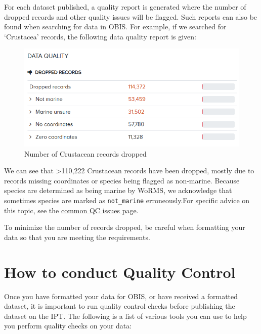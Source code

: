 \documentclass[
  letterpaper,
  DIV=11,
  numbers=noendperiod,
  oneside]{scrreprt}
\begin{document}
For each dataset published, a quality report is generated where the
number of dropped records and other quality issues will be flagged. Such
reports can also be found when searching for data in OBIS. For example,
if we searched for `Crustacea' records, the following data quality
report is given:

\begin{figure}

{\centering \includegraphics{images/crustacean-droppedrecords.png}

}

\caption{Number of Crustacean records dropped}

\end{figure}

We can see that \textgreater110,222 Crustacean records have been
dropped, mostly due to records missing coordinates or species being
flagged as non-marine. Because species are determined as being marine by
WoRMS, we acknowledge that sometimes species are marked as
\texttt{not\_marine} erroneously.For specific advice on this topic, see
the \protect\hyperlink{non-marine-species}{common QC issues page}.

To minimize the number of records dropped, be careful when formatting
your data so that you are meeting the requirements.

\hypertarget{how-to-conduct-quality-control}{%
\section{How to conduct Quality
Control}\label{how-to-conduct-quality-control}}

Once you have formatted your data for OBIS, or have received a formatted
dataset, it is important to run quality control checks before publishing
the dataset on the IPT. The following is a list of various tools you can
use to help you perform quality checks on your data:
\end{document}

